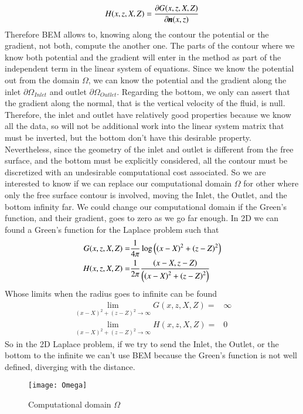 %
\begin{eqnarray*}
H(x, z, X, Z) = \frac{\partial G(x, z, X, Z)}{\partial \bs{n}(x, z)}
\end{eqnarray*}
%
Therefore BEM allows to, knowing along the contour the potential or
the gradient, not both, compute the another one. The parts of the
contour where we know both potential and the gradient will enter in
the method as part of the independent term in the linear system of
equations.\rc
%
Since we know the potential out from the domain $\Omega$, we can know
the potential and the gradient along the inlet $\partial \Omega_{Inlet}$
and outlet $\partial \Omega_{Outlet}$.\rc
%
Regarding the bottom, we only can assert that the gradient along the
normal, that is the vertical velocity of the fluid, is null.\rc
%
Therefore, the inlet and outlet have relatively good properties because
we know all the data, so will not be additional work into the linear
system matrix that must be inverted, but the bottom don't have this
desirable property.\rc
%
Nevertheless, since the geometry of the inlet and
outlet is different from the free surface, and the bottom must be
explicitly considered, all the contour must be discretized with an
undesirable computational cost associated.\rc
%
So we are interested to know if we can replace our computational
domain $\Omega$ for other where only the free surface contour is
involved, moving the Inlet, the Outlet, and the bottom infinity far. We
could change our computational domain if the Green's function, and their
gradient, goes to zero as we go far enough. In 2D we can found a Green's
function for the Laplace problem such that
%
\begin{eqnarray}
	\label{eq:laplace2D:g}
	G(x, z, X, Z) = & \dsty{\frac{1}{4 \pi}} \log \left( \left(x - X\right)^2 + \left(z - Z\right)^2 \right)
	\\
	\label{eq:laplace2D:h}
	H(x, z, X, Z) = & \dsty{\frac{1}{2 \pi}} \frac{\left( x - X, z - Z \right)}{\left( \left(x - X\right)^2 + \left(z - Z\right)^2 \right)}
\end{eqnarray}
%
Whose limits when the radius goes to infinite can be found
%
\begin{eqnarray}
	\label{eq:laplace2D:limit_g}
	\lim_{(x-X)^2 + (z-Z)^2 \to \infty} G(x, z, X, Z) = & \infty
	\\
	\label{eq:laplace2D:limit_h}
	\lim_{(x-X)^2 + (z-Z)^2 \to \infty} H(x, z, X, Z) = & 0
\end{eqnarray}
%
So in the 2D Laplace problem, if we try to send the Inlet, the Outlet,
or the bottom to the infinite we can't use BEM because the Green's
function is not well defined, diverging with the distance.
%
\begin{figure}[ht!]
  \centering
  \texttt{[image: Omega]}
  \caption{Computational domain $\Omega$}
  \label{fig:ss:laplace2D:bem}
\end{figure}
%
